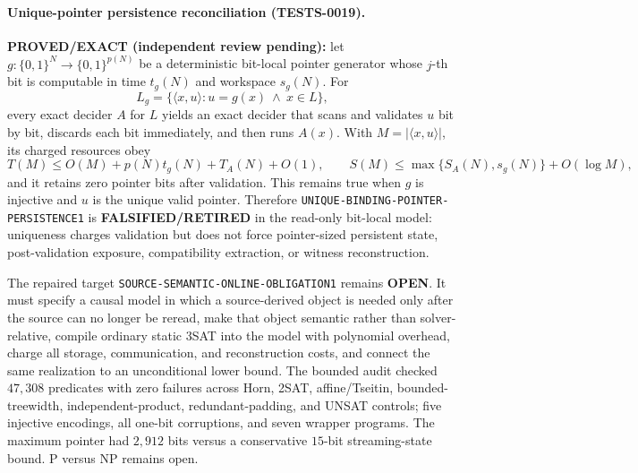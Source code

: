 \documentclass[11pt]{article}
\begin{document}
\paragraph{Unique-pointer persistence reconciliation (TESTS-0019).}
\textbf{PROVED/EXACT (independent review pending):} let
\(g:\{0,1\}^N\to\{0,1\}^{p(N)}\) be a deterministic bit-local pointer
generator whose \(j\)-th bit is computable in time \(t_g(N)\) and workspace
\(s_g(N)\).  For
\[
 L_g=\{\langle x,u\rangle:u=g(x)\ \land\ x\in L\},
\]
every exact decider \(A\) for \(L\) yields an exact decider that scans and
validates \(u\) bit by bit, discards each bit immediately, and then runs
\(A(x)\).  With \(M=|\langle x,u\rangle|\), its charged resources obey
\[
 T(M)\le O(M)+p(N)t_g(N)+T_A(N)+O(1),\qquad
 S(M)\le \max\{S_A(N),s_g(N)\}+O(\log M),
\]
and it retains zero pointer bits after validation.  This remains true when
\(g\) is injective and \(u\) is the unique valid pointer.  Therefore
\texttt{UNIQUE-BINDING-POINTER-PERSISTENCE1} is
\textbf{FALSIFIED/RETIRED} in the read-only bit-local model: uniqueness
charges validation but does not force pointer-sized persistent state,
post-validation exposure, compatibility extraction, or witness
reconstruction.

The repaired target \texttt{SOURCE-SEMANTIC-ONLINE-OBLIGATION1} remains
\textbf{OPEN}.  It must specify a causal model in which a source-derived
object is needed only after the source can no longer be reread, make that
object semantic rather than solver-relative, compile ordinary static 3SAT
into the model with polynomial overhead, charge all storage, communication,
and reconstruction costs, and connect the same realization to an
unconditional lower bound.  The bounded audit checked \(47{,}308\)
predicates with zero failures across Horn, 2SAT, affine/Tseitin,
bounded-treewidth, independent-product, redundant-padding, and UNSAT
controls; five injective encodings, all one-bit corruptions, and seven
wrapper programs.  The maximum pointer had \(2{,}912\) bits versus a
conservative \(15\)-bit streaming-state bound.  P versus NP remains open.
\end{document}
